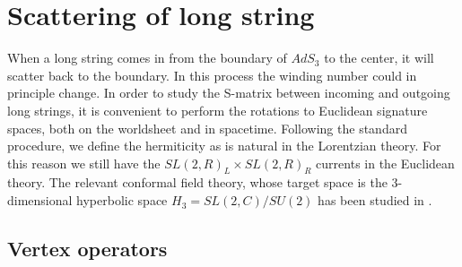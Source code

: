 





\section{Scattering of long string}

When a long string comes in from the boundary of $AdS_3$ 
to the center, it will scatter back to the boundary. 
In this process the winding number could in principle change.
In order to study the S-matrix between incoming and outgoing
long strings, it is convenient to perform the rotations to 
Euclidean signature spaces, both on the worldsheet and in spacetime.
Following the standard procedure, we define the hermiticity as is natural in 
the Lorentzian theory. For this reason we still have 
the $SL(2,R)_L \times SL(2,R)_R$  currents in the Euclidean theory. 
The relevant conformal field theory, whose target space is
the 3-dimensional hyperbolic space $H_3 = SL(2,C)/SU(2)$ has
been studied in \cite{Gawedzki:1991yu,Teschner:1997ft,
Teschner:1999ug,Giveon:1998ns,deBoer:1998pp,Kutasov:1999xu,Giribet:1999ft}. 


\subsection{Vertex operators}


